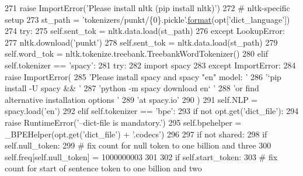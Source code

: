 \begin{DoxyCode}
271                 \textcolor{keywordflow}{raise} ImportError(\textcolor{stringliteral}{'Please install nltk (pip install nltk)'})
272             \textcolor{comment}{# nltk-specific setup}
273             st\_path = \textcolor{stringliteral}{'tokenizers/punkt/\{0\}.pickle'}.\hyperlink{namespaceparlai_1_1chat__service_1_1services_1_1messenger_1_1shared__utils_a32e2e2022b824fbaf80c747160b52a76}{format}(opt[\textcolor{stringliteral}{'dict\_language'}])
274             \textcolor{keywordflow}{try}:
275                 self.sent\_tok = nltk.data.load(st\_path)
276             \textcolor{keywordflow}{except} LookupError:
277                 nltk.download(\textcolor{stringliteral}{'punkt'})
278                 self.sent\_tok = nltk.data.load(st\_path)
279             self.word\_tok = nltk.tokenize.treebank.TreebankWordTokenizer()
280         \textcolor{keywordflow}{elif} self.tokenizer == \textcolor{stringliteral}{'spacy'}:
281             \textcolor{keywordflow}{try}:
282                 \textcolor{keyword}{import} spacy
283             \textcolor{keywordflow}{except} ImportError:
284                 \textcolor{keywordflow}{raise} ImportError(
285                     \textcolor{stringliteral}{'Please install spacy and spacy "en" model: '}
286                     \textcolor{stringliteral}{'`pip install -U spacy && '}
287                     \textcolor{stringliteral}{'python -m spacy download en` '}
288                     \textcolor{stringliteral}{'or find alternative installation options '}
289                     \textcolor{stringliteral}{'at spacy.io'}
290                 )
291             self.NLP = spacy.load(\textcolor{stringliteral}{'en'})
292         \textcolor{keywordflow}{elif} self.tokenizer == \textcolor{stringliteral}{'bpe'}:
293             \textcolor{keywordflow}{if} \textcolor{keywordflow}{not} opt.get(\textcolor{stringliteral}{'dict\_file'}):
294                 \textcolor{keywordflow}{raise} RuntimeError(\textcolor{stringliteral}{'--dict-file is mandatory.'})
295             self.bpehelper = \_BPEHelper(opt.get(\textcolor{stringliteral}{'dict\_file'}) + \textcolor{stringliteral}{'.codecs'})
296 
297         \textcolor{keywordflow}{if} \textcolor{keywordflow}{not} shared:
298             \textcolor{keywordflow}{if} self.null\_token:
299                 \textcolor{comment}{# fix count for null token to one billion and three}
300                 self.freq[self.null\_token] = 1000000003
301 
302             \textcolor{keywordflow}{if} self.start\_token:
303                 \textcolor{comment}{# fix count for start of sentence token to one billion and two}

\end{DoxyCode}
